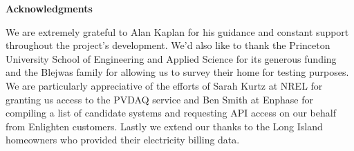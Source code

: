 \documentclass[pageno]{jpaper}
\begin{document}
\bigskip
\bigskip
\bigskip



\begin{center}
\textbf{Acknowledgments}
\end{center}
We are extremely grateful to Alan Kaplan for his guidance and constant support throughout the project's development. We'd also like to thank the Princeton University School of Engineering and Applied Science for its generous funding and the Blejwas family for allowing us to survey their home for testing purposes. We are particularly appreciative of the efforts of Sarah Kurtz at NREL for granting us access to the PVDAQ service and Ben Smith at Enphase for compiling a list of candidate systems and requesting API access on our behalf from Enlighten customers. Lastly we extend our thanks to the Long Island homeowners who provided their electricity billing data.



\end{document}
